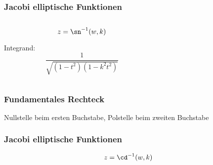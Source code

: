 \documentclass[ngerman, aspectratio=169, xcolor={rgb}]{beamer}
\begin{document}
	\begin{frame}
		\frametitle{Jacobi elliptische Funktionen}
		\begin{columns}
			\begin{column}{0.2\textwidth}

				\begin{equation*}
					z = \sn^{-1}(w, k)
				\end{equation*}

				\vspace{0.5cm}

				Integrand:
				\begin{equation*}
					\frac{
						1
					}{
						\sqrt{
							(1-t^2)(1-k^2 t^2)
						}
					}
				\end{equation*}

			\end{column}
			\begin{column}{0.8\textwidth}
				\begin{center}
					\scalebox{0.75}{
						
					}
				\end{center}
			\end{column}
		\end{columns}


	\end{frame}

	\begin{frame}
		\frametitle{Fundamentales Rechteck}

		Nullstelle beim ersten Buchstabe, Polstelle beim zweiten Buchstabe

		\begin{center}
			\scalebox{0.8}{
				
			}
		\end{center}

	\end{frame}


	\begin{frame}
		\frametitle{Jacobi elliptische Funktionen}

		\begin{equation*}
			z = \cd^{-1}(w, k)
		\end{equation*}

		\begin{center}
			\scalebox{0.7}{
				

			}
		\end{center}

	\end{frame}
\end{document}
